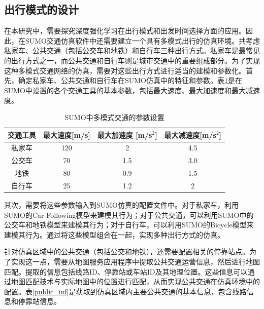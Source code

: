 \subsection{出行模式的设计}

在本研究中，需要探究深度强化学习在出行模式和出发时间选择方面的应用。因此，在SUMO交通仿真软件中还需要建立一个具有多模式出行的仿真环境。共考虑私家车、公共交通（包括公交车和地铁）和自行车三种出行方式。私家车是最常见的出行方式之一，而公共交通和自行车则是城市交通中的重要组成部分。为了实现这种多模式交通网络的仿真，需要对这些出行方式进行适当的建模和参数化。首先，确定私家车、公共交通和自行车在SUMO仿真中的特征和参数。表\ref{mode_inf}是在SUMO中设置的各个交通工具的基本参数，包括最大速度、最大加速度和最大减速度。

\renewcommand{\arraystretch}{1.2} %
\begin{table}[htbp]
\centering
\caption{SUMO中多模式交通的参数设置}
\label{mode_inf}
\begin{tabular}{cccc}
\toprule
交通工具 & 最大速度{[}m/s{]}& 最大加速度 {[}m/s$^2${]}  & 最大减速度{[}m/s$^2${]}   \\
\midrule
私家车          & 120            & 2          &     4.5         \\
公交车           & 70           & 1.5     &   3.0         \\ 
地铁            & 80       & 0.9            &  1.5  \\
自行车             & 25      & 1.2         &  2     \\
\bottomrule
\end{tabular}
\end{table}



其次，需要将这些参数输入到SUMO仿真的配置文件中。对于私家车，利用SUMO的Car-Following模型来建模其行为；对于公共交通，可以利用SUMO中的公交车和地铁模型来建模其行为；对于自行车，可以利用SUMO的Bicycle模型来建模其行为。通过将这些模型组合在一起，实现多种出行方式的仿真。

针对仿真区域中的公共交通（包括公交和地铁），还需要配置相关的停靠站点。为了实现这一点，需要从地图服务应用程序中提取公共交通运营信息，然后进行地图匹配。提取的信息包括线路ID、停靠站或车站ID及其地理位置。这些信息可以通过地图匹配技术与实际地图中的位置进行匹配，从而实现公共交通在仿真环境中的配置。表\ref{public_inf}是获取到仿真区域内主要公共交通的基本信息，包含线路信息和停靠站信息。

